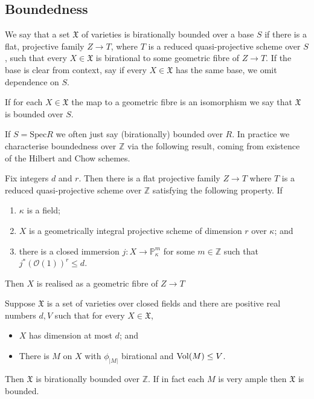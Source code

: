 \subsection{Boundedness}

\begin{definition}\label{d_birationally-bounded} We say that a set $\mathfrak{X}$ 
	of varieties is birationally bounded over a base $S$ if there is a flat, projective family $Z \to T$, where $T$ is a reduced quasi-projective scheme over $S$, such that every $X\in \mathfrak{X}$ is birational to some geometric fibre of $Z \to T$. If the base is clear from context, say if every $X \in \mathfrak{X}$ has the same base, we omit dependence on $S$.
	
	If for each $X \in \mathfrak{X}$ the map to a geometric fibre is an isomorphism we say that $\mathfrak{X}$ is bounded over $S$.
\end{definition}

If $S=\text{Spec}{R}$ we often just say (birationally) bounded over $R$. In practice we characterise boundedness over $\mathbb{Z}$ via the following result, coming from existence of the Hilbert and Chow schemes.

\begin{lemma}\cite[Proposition 5.3]{tanaka2019boundedness}
	Fix integers $d$ and $r$. Then there is a flat projective family $Z \to T$ where $T$ is a reduced quasi-projective scheme over $\mathbb{Z}$ satisfying the following property. If
	\begin{enumerate}
		\item $\kappa$ is a field;
		\item $X$ is a geometrically integral projective scheme of dimension $r$ over $\kappa$; and
		\item there is a closed immersion $j\colon X \to \mathbb{P}^{m}_{\kappa}$ for some $m\in \mathbb{Z}$ such that $j^{*}(\mathcal{O}(1))^{r} \leq d$.
	\end{enumerate}
	
	Then $X$ is realised as a geometric fibre of $Z \to T$
\end{lemma}

\begin{corollary}\label{l_birationally-bounded}
	Suppose $\mathfrak{X}$ is a set of varieties over closed fields and there are positive real numbers $d,V$ such that for every $X \in \mathfrak{X}$,
	\begin{itemize}
		\item $X$ has dimension at most $d$; and
		\item There is $M$ on $X$ with $\phi_{|M|}$ birational and $\text{Vol}(M)\leq V$.
	\end{itemize}
	Then $\mathfrak{X}$ is birationally bounded over $\mathbb{Z}$. If in fact each $M$ is very ample then $\mathfrak{X}$ is bounded. 
\end{corollary}

